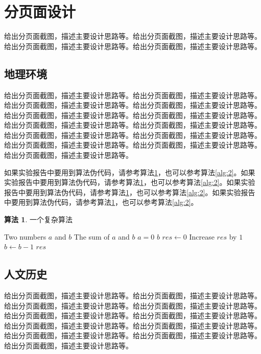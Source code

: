 \documentclass[supercite]{Experimental_Report}
\theoremstyle{definition}
\newtheorem{alg}{算法}[section]
\begin{document}
\section{分页面设计}

给出分页面截图，描述主要设计思路等。给出分页面截图，描述主要设计思路等。给出分页面截图，描述主要设计思路等。给出分页面截图，描述主要设计思路等。

\subsection{地理环境}

给出分页面截图，描述主要设计思路等。给出分页面截图，描述主要设计思路等。给出分页面截图，描述主要设计思路等。给出分页面截图，描述主要设计思路等。给出分页面截图，描述主要设计思路等。给出分页面截图，描述主要设计思路等。给出分页面截图，描述主要设计思路等。给出分页面截图，描述主要设计思路等。给出分页面截图，描述主要设计思路等。给出分页面截图，描述主要设计思路等。给出分页面截图，描述主要设计思路等。给出分页面截图，描述主要设计思路等。给出分页面截图，描述主要设计思路等。

如果实验报告中要用到算法伪代码，请参考算法\ref{alg:1}，也可以参考算法\ref{alg:2}。如果实验报告中要用到算法伪代码，请参考算法\ref{alg:1}，也可以参考算法\ref{alg:2}。如果实验报告中要用到算法伪代码，请参考算法\ref{alg:1}，也可以参考算法\ref{alg:2}。如果实验报告中要用到算法伪代码，请参考算法\ref{alg:1}，也可以参考算法\ref{alg:2}。

\begin{shaded*}\begin{alg}{一个复杂算法}
		\label{alg:1}
		\begin{algorithmic}
			\Input Two numbers $a$ and $b$
			\Output The sum of $a$ and $b$
			\If $a = 0$
			\State \Return $b$
			\EndIf
			\State $res \gets 0$
			\State Increase $res$ by $1$
			\State $b \gets b - 1$
			\EndWhile
			\State \Return $res$
			\EndProcedure
		\end{algorithmic}
\end{alg}\end{shaded*}

\subsection{人文历史}

给出分页面截图，描述主要设计思路等。给出分页面截图，描述主要设计思路等。给出分页面截图，描述主要设计思路等。给出分页面截图，描述主要设计思路等。给出分页面截图，描述主要设计思路等。给出分页面截图，描述主要设计思路等。给出分页面截图，描述主要设计思路等。给出分页面截图，描述主要设计思路等。给出分页面截图，描述主要设计思路等。给出分页面截图，描述主要设计思路等。给出分页面截图，描述主要设计思路等。
\end{document}
